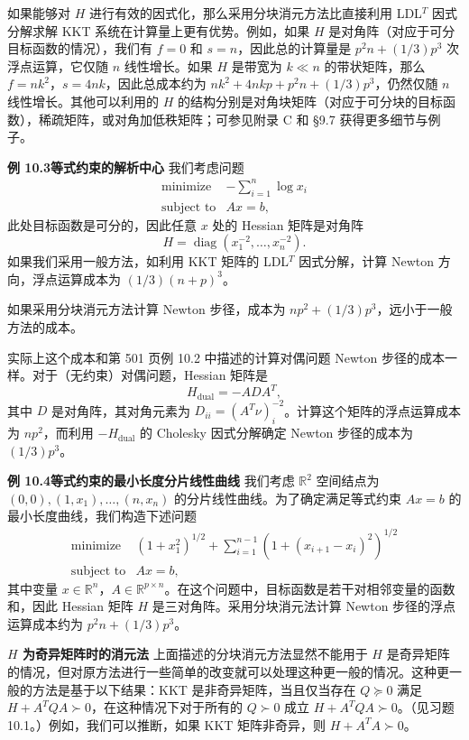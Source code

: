 \documentclass[UTF8, 12pt, fontset=fandol, oneside]{ctexart}
\begin{document}
如果能够对 $H$ 进行有效的因式化，那么采用分块消元方法比直接利用 LDL$^T$ 因式分解求解 KKT 系统在计算量上更有优势。例如，如果 $H$ 是对角阵（对应于可分目标函数的情况），我们有 $f=0$ 和 $s=n$，因此总的计算量是 $p^2n+(1/3)p^3$ 次浮点运算，它仅随 $n$ 线性增长。如果 $H$ 是带宽为 $k\ll n$ 的带状矩阵，那么 $f=nk^2$，$s=4nk$，因此总成本约为 $nk^2+4nkp+p^2n+(1/3)p^3$，仍然仅随 $n$ 线性增长。其他可以利用的 $H$ 的结构分别是对角块矩阵（对应于可分块的目标函数），稀疏矩阵，或对角加低秩矩阵；可参见附录 C 和 \S9.7 获得更多细节与例子。

\noindent\textbf{例 10.3\quad 等式约束的解析中心}\quad
我们考虑问题
\[
\begin{array}{ll}
\mbox{minimize} & -\displaystyle\sum_{i=1}^n\log x_i\\
\mbox{subject to} & Ax=b,
\end{array}
\]
此处目标函数是可分的，因此任意 $x$ 处的 Hessian 矩阵是对角阵
\[
H=\operatorname{diag}(x_1^{-2},\ldots,x_n^{-2}).
\]
如果我们采用一般方法，如利用 KKT 矩阵的 LDL$^T$ 因式分解，计算 Newton 方向，浮点运算成本为 $(1/3)(n+p)^3$。

如果采用分块消元方法计算 Newton 步径，成本为 $np^2+(1/3)p^3$，远小于一般方法的成本。

实际上这个成本和第 501 页例 10.2 中描述的计算对偶问题 Newton 步径的成本一样。对于（无约束）对偶问题，Hessian 矩阵是
\[
H_{\mathrm{dual}}=-ADA^T,
\]
其中 $D$ 是对角阵，其对角元素为 $D_{ii}=(A^T\nu)_i^{-2}$。计算这个矩阵的浮点运算成本为 $np^2$，而利用 $-H_{\mathrm{dual}}$ 的 Cholesky 因式分解确定 Newton 步径的成本为 $(1/3)p^3$。

\noindent\textbf{例 10.4\quad 等式约束的最小长度分片线性曲线}\quad
我们考虑 $\mathbb{R}^2$ 空间结点为 $(0,0),(1,x_1),\ldots,(n,x_n)$ 的分片线性曲线。为了确定满足等式约束 $Ax=b$ 的最小长度曲线，我们构造下述问题
\[
\begin{array}{ll}
\mbox{minimize} & (1+x_1^2)^{1/2}+\displaystyle\sum_{i=1}^{n-1}(1+(x_{i+1}-x_i)^2)^{1/2}\\
\mbox{subject to} & Ax=b,
\end{array}
\]
其中变量 $x\in\mathbb{R}^n$，$A\in\mathbb{R}^{p\times n}$。在这个问题中，目标函数是若干对相邻变量的函数和，因此 Hessian 矩阵 $H$ 是三对角阵。采用分块消元法计算 Newton 步径的浮点运算成本约为 $p^2n+(1/3)p^3$。

\noindent\textbf{$H$ 为奇异矩阵时的消元法}\quad
上面描述的分块消元方法显然不能用于 $H$ 是奇异矩阵的情况，但对原方法进行一些简单的改变就可以处理这种更一般的情况。这种更一般的方法是基于以下结果：KKT 是非奇异矩阵，当且仅当存在 $Q\succeq0$ 满足 $H+A^TQA\succ0$，在这种情况下对于所有的 $Q\succ0$ 成立 $H+A^TQA\succ0$。（见习题 10.1。）例如，我们可以推断，如果 KKT 矩阵非奇异，则 $H+A^TA\succ0$。
\end{document}
